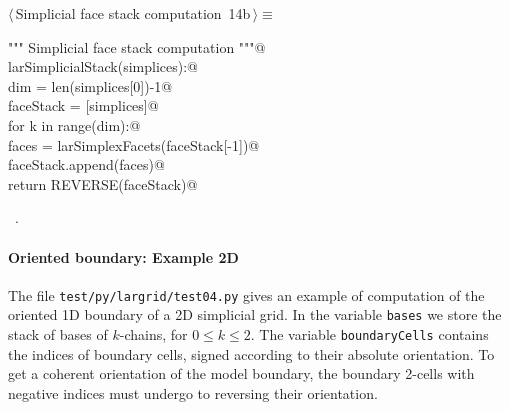 \documentclass[11pt,oneside]{article}	%
\begin{document}
\begin{flushleft} \small \label{scrap20}
\protect{}$\langle\,$Simplicial face stack computation\nobreak\ {\footnotesize 14b}$\,\rangle\equiv$
\vspace{-1ex}
\begin{list}{}{} \item
\mbox{}\verb@""" Simplicial face stack computation """@\\
\mbox{}\verb@def larSimplicialStack(simplices):@\\
\mbox{}\verb@   dim = len(simplices[0])-1@\\
\mbox{}\verb@   faceStack = [simplices]@\\
\mbox{}\verb@   for k in range(dim):@\\
\mbox{}\verb@      faces = larSimplexFacets(faceStack[-1])@\\
\mbox{}\verb@      faceStack.append(faces)@\\
\mbox{}\verb@   return REVERSE(faceStack)@\\
\mbox{}\verb@@{\NWsep}
\end{list}
\vspace{-1ex}
\footnotesize\addtolength{\baselineskip}{-1ex}
\begin{list}{}{\setlength{\itemsep}{-\parsep}\setlength{\itemindent}{-\leftmargin}}
\item \NWtxtMacroRefIn\ .
\end{list}
\end{flushleft}

\paragraph{Oriented boundary: Example 2D}
The file \texttt{test/py/largrid/test04.py} gives an example of computation of the oriented 1D boundary of a 2D simplicial grid. In the variable \texttt{bases} we store the stack of bases of $k$-chains, for $0\leq k\leq 2$. The variable \texttt{boundaryCells} contains the indices of boundary cells, signed according to their absolute orientation. To get a coherent orientation of the model boundary, the boundary 2-cells with negative indices must undergo to reversing their orientation.
 
\end{document}
